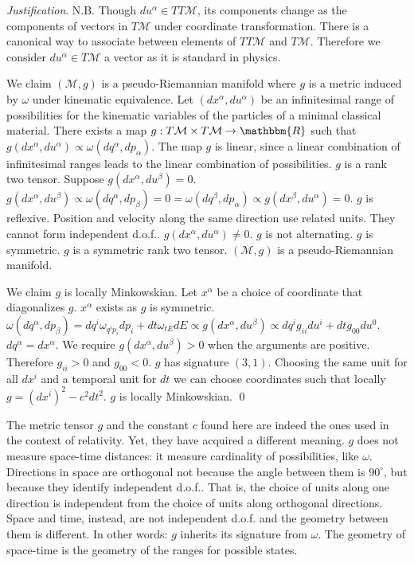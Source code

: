 \documentclass[aps,pra,10pt,twocolumn,floatfix,nofootinbib]{revtex4-1}
\numberwithin{equation}{section}
\theoremstyle{definition}
\newenvironment{justification}{\emph{Justification}.}{\qed}
\begin{document}
\begin{justification}
	N.B. Though $du^\alpha \in TT\mathcal{M}$, its components change as the components of vectors in $T\mathcal{M}$ under coordinate transformation. There is a canonical way to associate between elements of $TT\mathcal{M}$ and $T\mathcal{M}$. Therefore we consider $du^\alpha \in T\mathcal{M}$ a vector as it is standard in physics.
	
	We claim $(\mathcal{M}, g)$ is a pseudo-Riemannian manifold where $g$ is a metric induced by $\omega$ under kinematic equivalence. Let $(dx^\alpha, du^\alpha)$ be an infinitesimal range of possibilities for the kinematic variables of the particles of a minimal classical material. There exists a map $g : T\mathcal{M} \times T\mathcal{M} \rightarrow \mathbbm{R}$ such that $g(dx^\alpha, du^\alpha) \propto \omega(dq^\alpha, dp_\alpha)$. The map $g$ is linear, since a linear combination of infinitesimal ranges leads to the linear combination of possibilities. $g$ is a rank two tensor. Suppose $g(dx^\alpha, du^\beta) = 0$. $g(dx^\alpha, du^\beta) \propto \omega(dq^\alpha, dp_\beta) = 0 = \omega(dq^\beta, dp_\alpha) \propto g(dx^\beta, du^\alpha) = 0$. $g$ is reflexive. Position and velocity along the same direction use related units. They cannot form independent d.o.f.. $g(dx^\alpha, du^\alpha) \neq 0$. $g$ is not alternating. $g$ is symmetric. $g$ is a symmetric rank two tensor. $(\mathcal{M}, g)$ is a pseudo-Riemannian manifold.
	
	We claim $g$ is locally Minkowskian. Let $x^\alpha$ be a choice of coordinate that diagonalizes $g$. $x^\alpha$ exists as $g$ is symmetric. $\omega(dq^\alpha, dp_\beta) = dq^i \omega_{q^ip_i} dp_i + dt \omega_{tE} dE \propto g(dx^\alpha, du^\beta) \propto dq^i g_{ii} du^i + dt g_{00} du^0$. $dq^\alpha = dx^\alpha$. We require $g(dx^\alpha, du^\beta)>0$ when the arguments are positive. Therefore $g_{ii} > 0$ and $g_{00} < 0$. $g$ has signature $(3, 1)$. Choosing the same unit for all $dx^i$ and a temporal unit for $dt$ we can choose coordinates such that locally $g = (dx^i)^2 - c^2 dt^2$. $g$ is locally Minkowskian.
\end{justification}

The metric tensor $g$ and the constant $c$ found here are indeed the ones used in the context of relativity. Yet, they have acquired a different meaning. $g$ does not measure space-time distances: it measure cardinality of possibilities, like $\omega$. Directions in space are orthogonal not because the angle between them is $90^\circ$, but because they identify independent d.o.f.. That is, the choice of units along one direction is independent from the choice of units along orthogonal directions. Space and time, instead, are not independent d.o.f. and the geometry between them is different. In other words: $g$ inherits its signature from $\omega$. The geometry of space-time is the geometry of the ranges for possible states.
\end{document}
